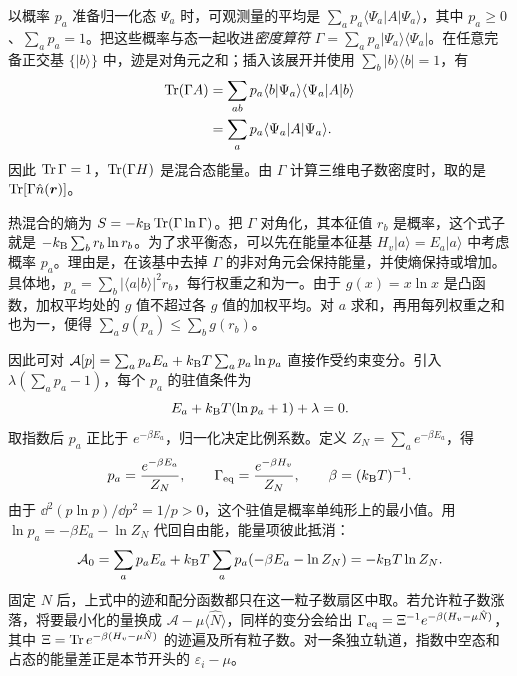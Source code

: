 以概率 $p_a$ 准备归一化态 $\Psi_a$ 时，可观测量的平均是 $\sum_a p_a\langle\Psi_a|A|\Psi_a\rangle$，其中 $p_a\ge0$、$\sum_a p_a=1$。把这些概率与态一起收进\emph{密度算符}
$\Gamma=\sum_a p_a|\Psi_a\rangle\langle\Psi_a|$。在任意完备正交基 $\{|b\rangle\}$ 中，迹是对角元之和；插入该展开并使用 $\sum_b|b\rangle\langle b|=1$，有
\begin{align}
\operatorname{Tr}(\Gamma A)
&=\sum_{ab}p_a\langle b|\Psi_a\rangle\langle\Psi_a|A|b\rangle\notag\\
&=\sum_a p_a\langle\Psi_a|A|\Psi_a\rangle.
\end{align}
因此 $\operatorname{Tr}\Gamma=1$，$\operatorname{Tr}(\Gamma H)$ 是混合态能量。由 $\Gamma$ 计算三维电子数密度时，取的是 $\operatorname{Tr}[\Gamma\hat n(\bm r)]$。

热混合的熵为 $S=-k_{\mathrm B}\operatorname{Tr}(\Gamma\ln\Gamma)$。把 $\Gamma$ 对角化，其本征值 $r_b$ 是概率，这个式子就是 $-k_{\mathrm B}\sum_b r_b\ln r_b$。为了求平衡态，可以先在能量本征基 $H_v|a\rangle=E_a|a\rangle$ 中考虑概率 $p_a$。理由是，在该基中去掉 $\Gamma$ 的非对角元会保持能量，并使熵保持或增加。具体地，$p_a=\sum_b|\langle a|b\rangle|^2r_b$，每行权重之和为一。由于 $g(x)=x\ln x$ 是凸函数，加权平均处的 $g$ 值不超过各 $g$ 值的加权平均。对 $a$ 求和，再用每列权重之和也为一，便得 $\sum_a g(p_a)\le\sum_b g(r_b)$。

因此可对
$\mathcal A[p]=\sum_a p_aE_a+k_{\mathrm B} T\sum_a p_a\ln p_a$
直接作受约束变分。引入 $\lambda(\sum_a p_a-1)$，每个 $p_a$ 的驻值条件为
\begin{equation}
E_a+k_{\mathrm B} T(\ln p_a+1)+\lambda=0.
\end{equation}
取指数后 $p_a$ 正比于 $e^{-\beta E_a}$，归一化决定比例系数。定义 $Z_N=\sum_a e^{-\beta E_a}$，得
\begin{equation}\label{dft:gibbs}
p_a=\frac{e^{-\beta E_a}}{Z_N},\qquad
\Gamma_{\rm eq}=\frac{e^{-\beta H_v}}{Z_N},\qquad
\beta=(k_{\mathrm B} T)^{-1}.
\end{equation}
由于 $\dd^2(p\ln p)/\dd p^2=1/p>0$，这个驻值是概率单纯形上的最小值。用 $\ln p_a=-\beta E_a-\ln Z_N$ 代回自由能，能量项彼此抵消：
\begin{equation}\label{dft:canonical-free-energy}
\mathcal A_0=\sum_a p_aE_a+k_{\mathrm B} T\sum_a p_a(-\beta E_a-\ln Z_N)
=-k_{\mathrm B} T\ln Z_N.
\end{equation}
固定 $N$ 后，上式中的迹和配分函数都只在这一粒子数扇区中取。若允许粒子数涨落，将要最小化的量换成 $\mathcal A-\mu\langle\hat N\rangle$，同样的变分会给出 $\Gamma_{\rm eq}=\Xi^{-1}e^{-\beta(H_v-\mu\hat N)}$，其中 $\Xi=\operatorname{Tr} e^{-\beta(H_v-\mu\hat N)}$ 的迹遍及所有粒子数。对一条独立轨道，指数中空态和占态的能量差正是本节开头的 $\varepsilon_i-\mu$。

